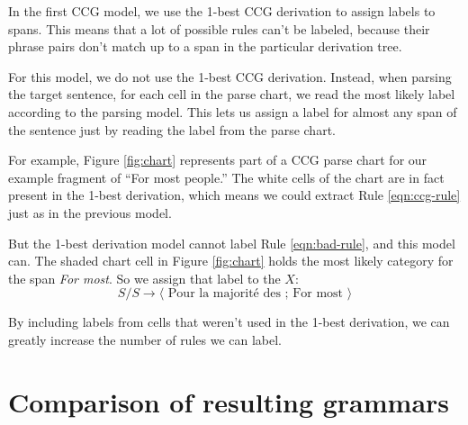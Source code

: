 \documentclass[a4paper]{article}
\begin{document}
In the first CCG model, we use the 1-best CCG derivation to assign labels to spans. This means that a lot of possible rules can't be labeled, because their phrase pairs don't match up to a span in the particular derivation tree.

For this model, we do not use the 1-best CCG derivation. Instead, when parsing the target sentence, for each cell in the parse chart, we read the most likely label according to the parsing model. This lets us assign a label for almost any span of the sentence just by reading the label from the parse chart.

For example, Figure \ref{fig:chart} represents part of a CCG parse chart for our example fragment of ``For most people.'' The white cells of the chart are in fact present in the 1-best derivation, which means we could extract Rule \ref{eqn:ccg-rule} just as in the previous model.

But the 1-best derivation model cannot label Rule \ref{eqn:bad-rule}, and this model can. The shaded chart cell in Figure \ref{fig:chart} holds the most likely category for the span {\em For most}. So we assign that label to the $X$:
\begin{equation*}
S/S \to \langle \textrm{ Pour la majorit\'{e} des ; For most } \rangle
\end{equation*}

By including labels from cells that weren't used in the 1-best derivation, we can greatly increase the number of rules we can label.


\section{Comparison of resulting grammars}
\label{sec:comparison}
\end{document}
